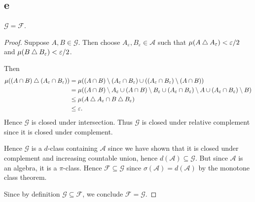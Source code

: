 \documentclass{unswmaths}
\begin{document}
\subsection*{e}
\begin{theorem}
    $\mathcal{G} = \mathcal{F}$.
\end{theorem}
\begin{proof}
    Suppose $A,B \in \mathcal{G}$. Then 
    choose $A_\varepsilon,B_\varepsilon \in \mathcal{A}$ such that
    $\mu(A\bigtriangleup A_\varepsilon) < \varepsilon/2$ and $\mu(B\bigtriangleup B_\varepsilon) < \varepsilon/2$.
    
    Then 
    \begin{align*}
        \mu((A\cap B)\bigtriangleup (A_\varepsilon\cap B_\varepsilon)) &= \mu((A\cap B)\setminus(A_\varepsilon \cap B_\varepsilon)\cup((A_\varepsilon\cap B_\varepsilon)\setminus (A\cap B))\\
        &= \mu((A\cap B)\setminus A_\varepsilon \cup (A\cap B)\setminus B_\varepsilon \cup (A_\varepsilon \cap B_\varepsilon)\setminus A \cup (A_\varepsilon \cap B_\varepsilon)\setminus B)\\
        &\leq \mu(A\bigtriangleup A_\varepsilon \cap B\bigtriangleup B_\varepsilon)\\
        &\leq \varepsilon.        
    \end{align*}
    Hence $\mathcal{G}$ is closed under intersection. Thus $\mathcal{G}$
    is closed under relative complement since it is closed
    under complement.

    Hence $\mathcal{G}$ is a $d$-class containing $\mathcal{A}$ since we have
    shown that it is closed under complement and increasing countable union, hence $d(\mathcal{A}) \subseteq \mathcal{G}$.
    But since $\mathcal{A}$ is an algebra, it is a $\pi$-class. Hence $\mathcal{F} \subseteq \mathcal{G}$
    since $\sigma(\mathcal{A}) = d(\mathcal{A})$ by the monotone class theorem.  
    
    Since by definition $\mathcal{G} \subseteq \mathcal{F}$,
    we conclude $\mathcal{F} = \mathcal{G}$.  
\end{proof}
\end{document}
